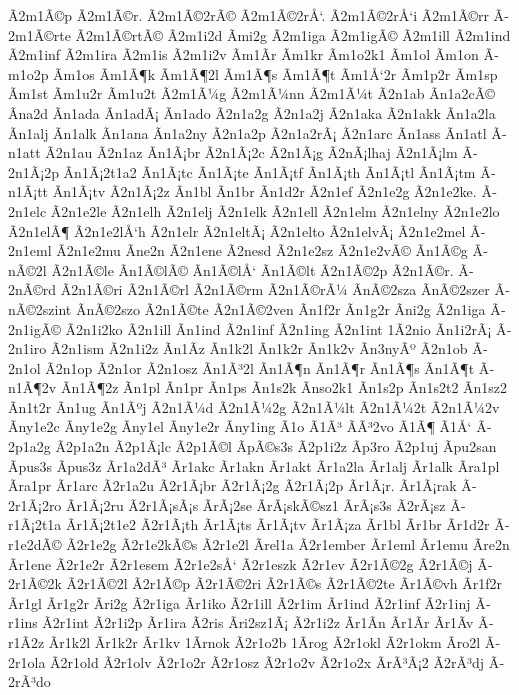 {Ã­2m1Ã©p
Ã­2m1Ã©r.
Ã­2m1Ã©2rÃ©
Ã­2m1Ã©2rÅ‘.
Ã­2m1Ã©2rÅ‘i
Ã­2m1Ã©rr
Ã­2m1Ã©rte
Ã­2m1Ã©rtÃ©
Ã­2m1i2d
Ã­mi2g
Ã­2m1iga
Ã­2m1igÃ©
Ã­2m1ill
Ã­2m1ind
Ã­2m1inf
Ã­2m1ira
Ã­2m1is
Ã­2m1i2v
Ã­m1Ã­r
Ã­m1kr
Ã­m1o2k1
Ã­m1ol
Ã­m1on
Ã­m1o2p
Ã­m1os
Ã­m1Ã¶k
Ã­m1Ã¶2l
Ã­m1Ã¶s
Ã­m1Ã¶t
Ã­m1Å‘2r
Ã­m1p2r
Ã­m1sp
Ã­m1st
Ã­m1u2r
Ã­m1u2t
Ã­2m1Ã¼g
Ã­2m1Ã¼nn
Ã­2m1Ã¼t
Ã­2n1ab
Ã­n1a2cÃ©
Ã­na2d
Ã­n1ada
Ã­n1adÃ¡
Ã­n1ado
Ã­2n1a2g
Ã­2n1a2j
Ã­2n1aka
Ã­2n1akk
Ã­n1a2la
Ã­n1alj
Ã­n1alk
Ã­n1ana
Ã­n1a2ny
Ã­2n1a2p
Ã­2n1a2rÃ¡
Ã­2n1arc
Ã­n1ass
Ã­n1atl
Ã­n1att
Ã­2n1au
Ã­2n1az
Ã­n1Ã¡br
Ã­2n1Ã¡2c
Ã­2n1Ã¡g
Ã­2nÃ¡lhaj
Ã­2n1Ã¡lm
Ã­2n1Ã¡2p
Ã­n1Ã¡2t1a2
Ã­n1Ã¡tc
Ã­n1Ã¡te
Ã­n1Ã¡tf
Ã­n1Ã¡th
Ã­n1Ã¡tl
Ã­n1Ã¡tm
Ã­n1Ã¡tt
Ã­n1Ã¡tv
Ã­2n1Ã¡2z
Ã­n1bl
Ã­n1br
Ã­n1d2r
Ã­2n1ef
Ã­2n1e2g
Ã­2n1e2ke.
Ã­2n1elc
Ã­2n1e2le
Ã­2n1elh
Ã­2n1elj
Ã­2n1elk
Ã­2n1ell
Ã­2n1elm
Ã­2n1elny
Ã­2n1e2lo
Ã­2n1elÃ¶
Ã­2n1e2lÅ‘h
Ã­2n1elr
Ã­2n1eltÃ¡
Ã­2n1elto
Ã­2n1elvÃ¡
Ã­2n1e2mel
Ã­2n1eml
Ã­2n1e2mu
Ã­ne2n
Ã­2n1ene
Ã­2nesd
Ã­2n1e2sz
Ã­2n1e2vÃ©
Ã­n1Ã©g
Ã­nÃ©2l
Ã­2n1Ã©le
Ã­n1Ã©lÃ©
Ã­n1Ã©lÅ‘
Ã­n1Ã©lt
Ã­2n1Ã©2p
Ã­2n1Ã©r.
Ã­2nÃ©rd
Ã­2n1Ã©ri
Ã­2n1Ã©rl
Ã­2n1Ã©rm
Ã­2n1Ã©rÃ¼
Ã­nÃ©2sza
Ã­nÃ©2szer
Ã­nÃ©2szint
Ã­nÃ©2szo
Ã­2n1Ã©te
Ã­2n1Ã©2ven
Ã­n1f2r
Ã­n1g2r
Ã­ni2g
Ã­2n1iga
Ã­2n1igÃ©
Ã­2n1i2ko
Ã­2n1ill
Ã­n1ind
Ã­2n1inf
Ã­2n1ing
Ã­2n1int
1Ã­2nio
Ã­n1i2rÃ¡
Ã­2n1iro
Ã­2n1ism
Ã­2n1i2z
Ã­n1Ã­z
Ã­n1k2l
Ã­n1k2r
Ã­n1k2v
Ã­n3nyÃº
Ã­2n1ob
Ã­2n1ol
Ã­2n1op
Ã­2n1or
Ã­2n1osz
Ã­n1Ã³2l
Ã­n1Ã¶n
Ã­n1Ã¶r
Ã­n1Ã¶s
Ã­n1Ã¶t
Ã­n1Ã¶2v
Ã­n1Ã¶2z
Ã­n1pl
Ã­n1pr
Ã­n1ps
Ã­n1s2k
Ã­nso2k1
Ã­n1s2p
Ã­n1s2t2
Ã­n1sz2
Ã­n1t2r
Ã­n1ug
Ã­n1Ãºj
Ã­2n1Ã¼d
Ã­2n1Ã¼2g
Ã­2n1Ã¼lt
Ã­2n1Ã¼2t
Ã­2n1Ã¼2v
Ã­ny1e2c
Ã­ny1e2g
Ã­ny1el
Ã­ny1e2r
Ã­ny1ing
Ã­1o
Ã­1Ã³
Ã­Ã³2vo
Ã­1Ã¶
Ã­1Å‘
Ã­2p1a2g
Ã­2p1a2n
Ã­2p1Ã¡lc
Ã­2p1Ã©l
Ã­pÃ©s3s
Ã­2p1i2z
Ã­p3ro
Ã­2p1uj
Ã­pu2san
Ã­pus3s
Ã­pus3z
Ã­r1a2dÃ³
Ã­r1akc
Ã­r1akn
Ã­r1akt
Ã­r1a2la
Ã­r1alj
Ã­r1alk
Ã­ra1pl
Ã­ra1pr
Ã­r1arc
Ã­2r1a2u
Ã­2r1Ã¡br
Ã­2r1Ã¡2g
Ã­2r1Ã¡2p
Ã­r1Ã¡r.
Ã­r1Ã¡rak
Ã­2r1Ã¡2ro
Ã­r1Ã¡2ru
Ã­2r1Ã¡sÃ¡s
Ã­rÃ¡2se
Ã­rÃ¡skÃ©sz1
Ã­rÃ¡s3s
Ã­2rÃ¡sz
Ã­r1Ã¡2t1a
Ã­r1Ã¡2t1e2
Ã­2r1Ã¡th
Ã­r1Ã¡ts
Ã­r1Ã¡tv
Ã­r1Ã¡za
Ã­r1bl
Ã­r1br
Ã­r1d2r
Ã­r1e2dÃ©
Ã­2r1e2g
Ã­2r1e2kÃ©s
Ã­2r1e2l
Ã­rel1a
Ã­2r1ember
Ã­r1eml
Ã­r1emu
Ã­re2n
Ã­r1ene
Ã­2r1e2r
Ã­2r1esem
Ã­2r1e2sÅ‘
Ã­2r1eszk
Ã­2r1ev
Ã­2r1Ã©2g
Ã­2r1Ã©j
Ã­2r1Ã©2k
Ã­2r1Ã©2l
Ã­2r1Ã©p
Ã­2r1Ã©2ri
Ã­2r1Ã©s
Ã­2r1Ã©2te
Ã­r1Ã©vh
Ã­r1f2r
Ã­r1gl
Ã­r1g2r
Ã­ri2g
Ã­2r1iga
Ã­r1iko
Ã­2r1ill
Ã­2r1im
Ã­r1ind
Ã­2r1inf
Ã­2r1inj
Ã­r1ins
Ã­2r1int
Ã­2r1i2p
Ã­r1ira
Ã­2ris
Ã­ri2sz1Ã¡
Ã­2r1i2z
Ã­r1Ã­n
Ã­r1Ã­r
Ã­r1Ã­v
Ã­r1Ã­2z
Ã­r1k2l
Ã­r1k2r
Ã­r1kv
1Ã­rnok
Ã­2r1o2b
1Ã­rog
Ã­2r1okl
Ã­2r1okm
Ã­ro2l
Ã­2r1ola
Ã­2r1old
Ã­2r1olv
Ã­2r1o2r
Ã­2r1osz
Ã­2r1o2v
Ã­2r1o2x
Ã­rÃ³Ã¡2
Ã­2rÃ³dj
Ã­2rÃ³do
}
